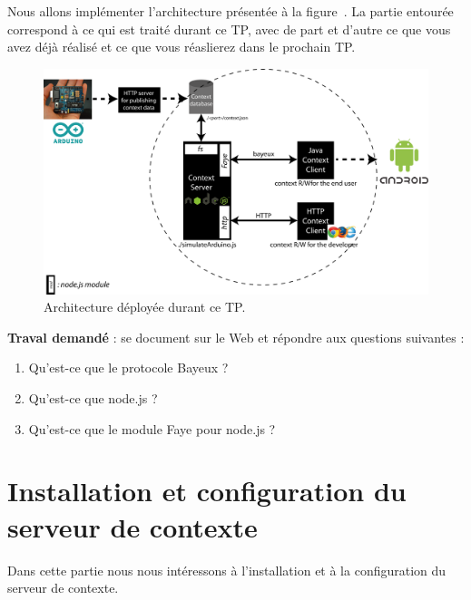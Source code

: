 \documentclass[a4paper,11pt,fleqn]{article}
\begin{document}
Nous allons implémenter l'architecture présentée à la figure~\label{fig:archi}.
La partie entourée correspond à ce qui est traité durant ce TP, avec de part et d'autre ce que vous avez déjà réalisé et ce que vous réaslierez dans le prochain TP.

\begin{figure}
\includegraphics[width=\textwidth]{./img/archi.png}
\caption{Architecture déployée durant ce TP.}
\end{figure}
\vspace{10pt}

\textbf{Traval demandé} : se document sur le Web et répondre aux questions suivantes :
\begin{enumerate}
	\item Qu'est-ce que le protocole Bayeux ?
	\item Qu'est-ce que node.js ?
	\item Qu'est-ce que le module Faye pour node.js ?
\end{enumerate}


\section{Installation et configuration du serveur de contexte}\label{sec:installandrun}

Dans cette partie nous nous intéressons à l'installation et à la configuration du serveur de contexte.\\
\end{document}
